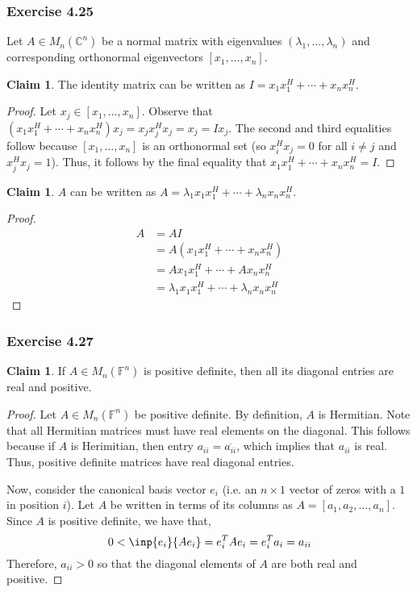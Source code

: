 \documentclass[letterpaper,12pt]{article}
\theoremstyle{definition}
\newtheorem{claim}[theorem]{Claim}
\begin{document}
\subsubsection*{Exercise 4.25}
Let $A \in M_n(\mathbb{C}^n)$ be a normal matrix with eigenvalues $(\lambda_1, \ldots, \lambda_n)$ and corresponding orthonormal eigenvectors $[x_1, \ldots, x_n]$. 
\begin{claim}
	The identity matrix can be written as $I = x_1 x_1^H + \cdots + x_n x_n^H$. 
\end{claim}
\begin{proof}
	Let $x_j \in [x_1, \ldots, x_n]$.  Observe that $( x_1 x_1^H + \cdots + x_n x_n^H ) x_j = x_j x_j^H x_j= x_j = I x_j$. The second and third equalities follow because $[x_1, \ldots, x_n]$  is an orthonormal set (so $x_i^Hx_j = 0$ for all $i \neq j$ and $x_j^H x_j = 1$).  Thus, it follows by the final equality that $x_1 x_1^H + \cdots + x_n x_n^H = I$. 
\end{proof}
\begin{claim}
	$A$ can be written as $A = \lambda_1 x_1 x_1^H + \cdots +\lambda_n x_n x_n^H$.
\end{claim}
\begin{proof}
	\begin{align*}
	A &= A I \\
	   &= A (x_1 x_1^H + \cdots + x_n x_n^H) \tag{by the above claim} \\
	   &= Ax_1 x_1^H + \cdots + A x_n x_n^H \\
	   &= \lambda_1 x_1 x_1^H + \cdots + \lambda_n x_n x_n^H \tag{because $Ax_i = \lambda_i x_i$}
	\end{align*}
\end{proof}

\subsubsection*{Exercise 4.27}
\begin{claim}
	If $A \in M_n(\mathbb{F}^n)$ is positive definite, then all its diagonal entries are real and positive. 
\end{claim}
\begin{proof}
	Let $A \in M_n(\mathbb{F}^n)$ be positive definite. By definition, $A$ is Hermitian. Note that all Hermitian matrices must have real elements on the diagonal. This follows because if $A$ is Herimitian, then entry $a_{ii} = \overline{a_{ii}}$, which implies that $a_{ii}$ is real. Thus, positive definite matrices have real diagonal entries.

	Now, consider the canonical basis vector $e_i$ (i.e. an $n\times 1$ vector of zeros with a $1$ in position $i$). Let $A$ be written in terms of its columns as $A = [a_1, a_2, \ldots, a_n]$. Since $A$ is positive definite, we have that,
	\begin{equation}
	0 < \inp{e_i}{Ae_i} = e_i^T A e_i = e_i^T a_i = a_{ii}
	\end{equation}
	Therefore, $a_{ii} > 0$ so that the diagonal elements of $A$ are both real and positive.
\end{proof}
\end{document}
